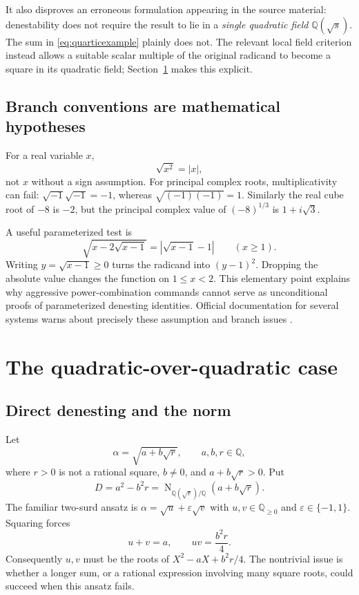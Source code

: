 \documentclass[11pt,oneside]{article}
\numberwithin{equation}{section}
\theoremstyle{definition}
\theoremstyle{remark}
\newcommand{\Q}{\mathbb{Q}}
\newcommand{\Nrm}{\operatorname{N}}
\begin{document}
It also disproves an erroneous formulation appearing in the source material: denestability does not require the result to lie in a \emph{single quadratic field} $\Q(\sqrt s)$. The sum in \eqref{eq:quarticexample} plainly does not. The relevant local field criterion instead allows a suitable scalar multiple of the original radicand to become a square in its quadratic field; Section~\ref{sec:quadratic} makes this explicit.

\subsection{Branch conventions are mathematical hypotheses}
For a real variable $x$,
\[
\sqrt{x^2}=|x|,
\]
not $x$ without a sign assumption. For principal complex roots, multiplicativity can fail: $\sqrt{-1}\sqrt{-1}=-1$, whereas $\sqrt{(-1)(-1)}=1$. Similarly the real cube root of $-8$ is $-2$, but the principal complex value of $(-8)^{1/3}$ is $1+i\sqrt3$.

A useful parameterized test is
\begin{equation}\label{eq:parameter}
\sqrt{x-2\sqrt{x-1}}=\left|\sqrt{x-1}-1\right|\qquad(x\ge1).
\end{equation}
Writing $y=\sqrt{x-1}\ge0$ turns the radicand into $(y-1)^2$. Dropping the absolute value changes the function on $1\le x<2$. This elementary point explains why aggressive power-combination commands cannot serve as unconditional proofs of parameterized denesting identities. Official documentation for several systems warns about precisely these assumption and branch issues \cite{sympy,wolframradicals,sage}.

\section{The quadratic-over-quadratic case}\label{sec:quadratic}

\subsection{Direct denesting and the norm}
Let
\begin{equation}\label{eq:alphaquadratic}
\alpha=\sqrt{a+b\sqrt r},\qquad a,b,r\in\Q,
\end{equation}
where $r>0$ is not a rational square, $b\ne0$, and $a+b\sqrt r>0$. Put
\[
D=a^2-b^2r=\Nrm_{\Q(\sqrt r)/\Q}(a+b\sqrt r).
\]
The familiar two-surd ansatz is $\alpha=\sqrt u+\varepsilon\sqrt v$ with $u,v\in\Q_{\ge0}$ and $\varepsilon\in\{-1,1\}$. Squaring forces
\[
u+v=a,\qquad uv=\frac{b^2r}{4}.
\]
Consequently $u,v$ must be the roots of $X^2-aX+b^2r/4$. The nontrivial issue is whether a longer sum, or a rational expression involving many square roots, could succeed when this ansatz fails.
\end{document}
